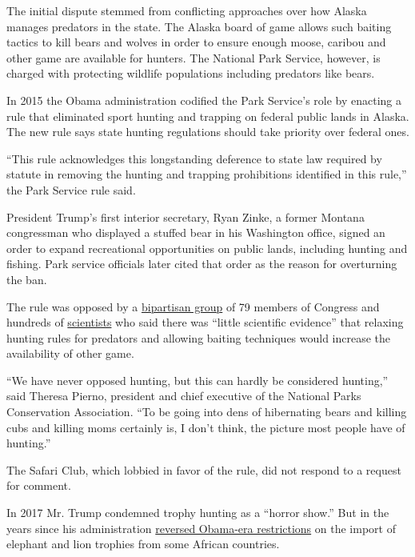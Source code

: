 The initial dispute stemmed from conflicting approaches over how Alaska
manages predators in the state. The Alaska board of game allows such
baiting tactics to kill bears and wolves in order to ensure enough
moose, caribou and other game are available for hunters. The National
Park Service, however, is charged with protecting wildlife populations
including predators like bears.

In 2015 the Obama administration codified the Park Service's role by
enacting a rule that eliminated sport hunting and trapping on federal
public lands in Alaska. The new rule says state hunting regulations
should take priority over federal ones.

``This rule acknowledges this longstanding deference to state law
required by statute in removing the hunting and trapping prohibitions
identified in this rule,'' the Park Service rule said.

President Trump's first interior secretary, Ryan Zinke, a former Montana
congressman who displayed a stuffed bear in his Washington office,
signed an order to expand recreational opportunities on public lands,
including hunting and fishing. Park service officials later cited that
order as the reason for overturning the ban.

The rule was opposed by a
\href{https://jayapal.house.gov/2018/08/09/jayapal-and-colleagues-urge-zinke-protect-alaskan-wildlife/}{bipartisan
group} of 79 members of Congress and hundreds of
\href{https://www.nationalparkstraveler.org/sites/default/files/attachments/8_23_colleague_letter_on_ak_national_preserves.pdf}{scientists}
who said there was ``little scientific evidence'' that relaxing hunting
rules for predators and allowing baiting techniques would increase the
availability of other game.

``We have never opposed hunting, but this can hardly be considered
hunting,'' said Theresa Pierno, president and chief executive of the
National Parks Conservation Association. ``To be going into dens of
hibernating bears and killing cubs and killing moms certainly is, I
don't think, the picture most people have of hunting.''

The Safari Club, which lobbied in favor of the rule, did not respond to
a request for comment.

In 2017 Mr. Trump condemned trophy hunting as a ``horror show.'' But in
the years since his administration
\href{https://www.nytimes3xbfgragh.onion/2018/03/07/science/trump-elephant-trophy-hunting.html}{reversed
Obama-era restrictions} on the import of elephant and lion trophies from
some African countries.

